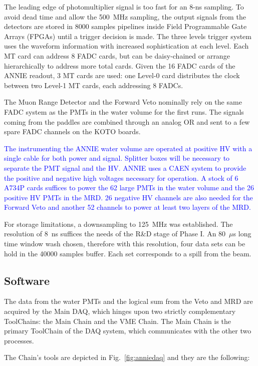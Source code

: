 The leading edge of photomultiplier signal is too fast for an 8-ns sampling.
To avoid dead time and allow the 500~MHz sampling, the output signals from the detectors %
are stored in 8000 samples pipelines inside Field Programmable Gate Arrays (FPGAs) until %
a trigger decision is made.
The three levels trigger system uses the waveform information with increased %
sophistication at each level.
Each MT card can address 8 FADC cards, but can be daisy-chained or arrange hierarchically to %
address more total cards.
Given the 16 FADC cards of the ANNIE readout, 3 MT cards are used: %
one Level-0 card distributes the clock between two Level-1 MT cards, each addressing 8 FADCs.

The Muon Range Detector and the Forward Veto nominally rely on the same FADC system as %
the PMTs in the water volume for the first runs.
The signals coming from the paddles are combined through an analog OR and sent to a %
few spare FADC channels on the KOTO boards. 

\textcolor{blue}{
The instrumenting the ANNIE water volume are operated at positive HV with a %
single cable for both power and signal.
Splitter boxes will be necessary to separate the PMT signal and the HV.
ANNIE uses a CAEN system to provide the positive and negative high voltages necessary for operation. 
A stock of 6 A734P cards suffices to power the 62 large PMTs in the water volume %
and the 26 positive HV PMTs in the MRD.
26 negative HV channels are also needed for the Forward Veto and another 52 channels to power %
at least two layers of the MRD.
}

For storage limitations, a downsampling to 125~MHz was established.
The resolution of 8~ns suffices the needs of the R\&D stage of Phase I.
An 80~$\mu$s long time window wash chosen, therefore with this resolution, four data sets can be %
hold in the 40000 samples buffer.
Each set corresponds to a spill from the beam.

\subsection{Software}

The data from the water PMTs and the logical sum from the Veto and MRD are acquired by the Main DAQ, %
which hinges upon two strictly complementary ToolChains: the Main Chain and the VME Chain.
The Main Chain is the primary ToolChain of the DAQ system, which communicates with the other two %
processes.

The Chain's tools are depicted in Fig.~\ref{fig:anniedaq} and they are the following:

